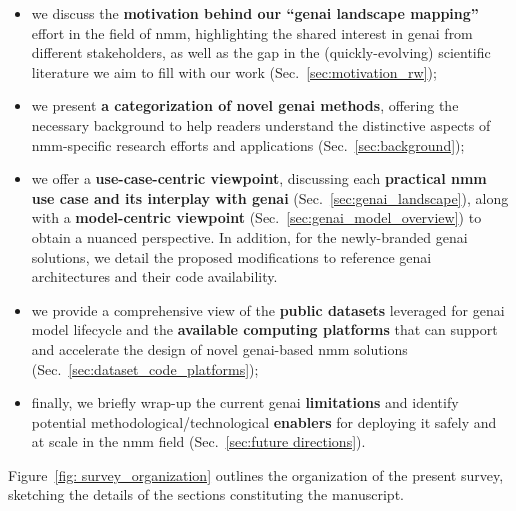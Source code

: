 \begin{itemize}

\item we discuss the \textbf{motivation behind our ``\gls{genai} landscape mapping''} effort in the field of \gls{nmm}, highlighting the shared interest in \gls{genai} from different stakeholders, as well as the gap in the (quickly-evolving) scientific literature we aim to fill with our work (Sec.~\ref{sec:motivation_rw});

\item 
we 
present
\textbf{a categorization of novel \gls{genai} methods}, 
offering the necessary background to help readers understand the distinctive aspects of \gls{nmm}-specific research efforts and applications (Sec.~\ref{sec:background});


\item we offer a \textbf{use-case-centric viewpoint}, discussing each \textbf{practical \gls{nmm} use case and its interplay with \gls{genai}} (Sec.~\ref{sec:genai_landscape}), along with a \textbf{model-centric viewpoint} (Sec.~\ref{sec:genai_model_overview}) to obtain a nuanced perspective. 
In addition, for the newly-branded \gls{genai} solutions, we detail the proposed modifications to reference \gls{genai} architectures and their code availability.





\item we provide a comprehensive view of
the \textbf{public datasets} leveraged for \gls{genai} model lifecycle and 
the
\textbf{available computing platforms} that can support and accelerate the design of novel \gls{genai}-based \gls{nmm} solutions (Sec.~\ref{sec:dataset_code_platforms});

\item finally, 
we briefly wrap-up the current \gls{genai} \textbf{limitations} and identify potential methodological/technological \textbf{enablers} for deploying it safely and at scale in the \gls{nmm} field (Sec.~\ref{sec:future directions}).
\end{itemize}
%
Figure~\ref{fig: survey_organization} outlines the organization of the present survey, sketching the details of the sections constituting the manuscript.








